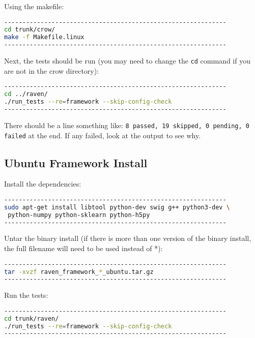 Using the makefile:

\begin{lstlisting}[language=bash]
-------------------------------------------------------------
cd trunk/crow/
make -f Makefile.linux
-------------------------------------------------------------
\end{lstlisting}

Next, the tests should be run (you may need to change the \verb'cd'
command if you are not in the crow directory):

\begin{lstlisting}[language=bash]
-------------------------------------------------------------
cd ../raven/
./run_tests --re=framework --skip-config-check
-------------------------------------------------------------
\end{lstlisting}

There should be a line something like:
{\tt 8 passed, 19 skipped, 0 pending, 0 failed}
at the end.  If any failed, look at the output to see why.


\subsection{Ubuntu Framework Install}

Install the dependencies:

\begin{lstlisting}[language=bash]
-------------------------------------------------------------
sudo apt-get install libtool python-dev swig g++ python3-dev \
 python-numpy python-sklearn python-h5py
-------------------------------------------------------------
\end{lstlisting}

Untar the binary install (if there is more than one version of the
binary install, the full filename will need to be used instead of *):

\begin{lstlisting}[language=bash]
-------------------------------------------------------------
tar -xvzf raven_framework_*_ubuntu.tar.gz
-------------------------------------------------------------
\end{lstlisting}

Run the tests:

\begin{lstlisting}[language=bash]
-------------------------------------------------------------
cd trunk/raven/
./run_tests --re=framework --skip-config-check
-------------------------------------------------------------
\end{lstlisting}

